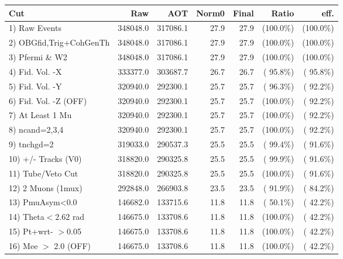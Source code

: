  \begin{table}[h!]\centering
 \begin{tabular}{||l||r|r|r|r|r|r||}
 \hline
 \hline
 Cut & Raw & AOT & Norm0 & Final & Ratio & eff.       \\
 \hline
  1) Raw Events           &     348048.0 &     317086.1 &         27.9 &         27.9 & (100.0\%) & (100.0\%) \\
  2) OBGfid,Trig+CohGenTh &     348048.0 &     317086.1 &         27.9 &         27.9 & (100.0\%) & (100.0\%) \\
  3) Pfermi \& W2         &     348048.0 &     317086.1 &         27.9 &         27.9 & (100.0\%) & (100.0\%) \\
  4) Fid. Vol. -X         &     333377.0 &     303687.7 &         26.7 &         26.7 & ( 95.8\%) & ( 95.8\%) \\
  5) Fid. Vol. -Y         &     320940.0 &     292300.1 &         25.7 &         25.7 & ( 96.3\%) & ( 92.2\%) \\
  6) Fid. Vol. -Z (OFF)   &     320940.0 &     292300.1 &         25.7 &         25.7 & (100.0\%) & ( 92.2\%) \\
  7) At Least 1 Mu        &     320940.0 &     292300.1 &         25.7 &         25.7 & (100.0\%) & ( 92.2\%) \\
  8) ncand=2,3,4          &     320940.0 &     292300.1 &         25.7 &         25.7 & (100.0\%) & ( 92.2\%) \\
  9) tnchgd=2             &     319033.0 &     290537.3 &         25.5 &         25.5 & ( 99.4\%) & ( 91.6\%) \\
 10) +/- Tracks (V0)      &     318820.0 &     290325.8 &         25.5 &         25.5 & ( 99.9\%) & ( 91.6\%) \\
 11) Tube/Veto Cut        &     318820.0 &     290325.8 &         25.5 &         25.5 & (100.0\%) & ( 91.6\%) \\
 12) 2 Muons (1mux)       &     292848.0 &     266903.8 &         23.5 &         23.5 & ( 91.9\%) & ( 84.2\%) \\
 13) PmuAsym<0.0          &     146682.0 &     133715.6 &         11.8 &         11.8 & ( 50.1\%) & ( 42.2\%) \\
 14) Theta$<$2.62 rad     &     146675.0 &     133708.6 &         11.8 &         11.8 & (100.0\%) & ( 42.2\%) \\
 15) Pt+wrt- $>$0.05      &     146675.0 &     133708.6 &         11.8 &         11.8 & (100.0\%) & ( 42.2\%) \\
 16) Mee $>$ 2.0  (OFF)   &     146675.0 &     133708.6 &         11.8 &         11.8 & (100.0\%) & ( 42.2\%) \\

\end{tabular}
\end{table}
